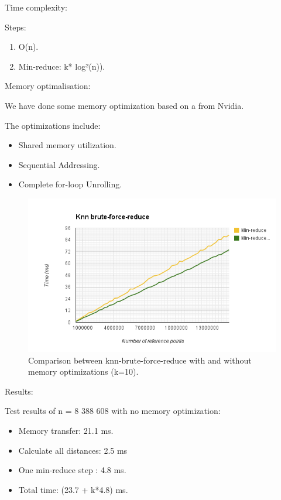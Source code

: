 \begin{enumerate}
\begin{enumerate}
Time complexity:

Steps:

\begin{enumerate}
    \item O(n).
    \item Min-reduce: k* log²(n)).
\end{enumerate}

Memory optimalisation:

We have done some memory optimization based on a 
from Nvidia.

The optimizations include:

\begin{itemize}
    \item Shared memory utilization.
    \item Sequential Addressing.
    \item Complete for-loop Unrolling.
\end{itemize}

\begin{figure}[ht!]
\centering
\includegraphics[width=120mm]{gfx/knn-brute-force-reduce-memory-opt.png}

\caption{Comparison between knn-brute-force-reduce with and without memory optimizations (k=10).}
\label{fig:knn_brute_force_reduce_memory_opt}
\end{figure}

Results:

Test results of n = 8 388 608 with no memory optimization:
\begin{itemize}
    \item Memory transfer:  21.1 ms.
    \item Calculate all distances: 2.5 ms
    \item One min-reduce step : 4.8 ms.
    \item Total time: (23.7 + k*4.8) ms.
\end{itemize}


\end{enumerate}
\end{enumerate}
